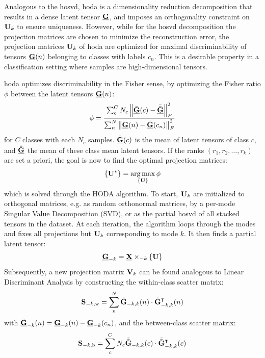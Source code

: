 Analogous to the \ac{hosvd}, \ac{hoda} is a dimensionality
reduction decomposition that results in a dense latent tensor $\ten{G}$, and
imposes an orthogonality constraint on $\mat{U}_k$ to ensure uniqueness.
However, while for the \ac{hosvd} decomposition the projection matrices
are chosen to minimize the reconstruction error, the projection matrices
$\mat{U}_k$ of \ac{hoda} are optimized for maximal discriminability of tensors
$\ten{G}(n)$ belonging to classes with labels $c_n$.
This is a desirable property in a classification setting where samples are
high-dimensional tensors.

\Ac{hoda} optimizes discriminability in the Fisher sense, by optimizing the
Fisher ratio $\phi$ between the latent tensors $\ten{G}(n)$:
\begin{equation}
	\phi = \frac{\sum_c^CN_c\left\lVert\bar{\ten{G}}(c)-\bar{\bar{\ten{G}}}\right\rVert_F^2}
	{\sum_n^N\left\lVert\ten{G}(n)-\bar{\ten{G}}(c_n)\right\rVert_F^2}
	\label{eq:fisher}
\end{equation}
for $C$ classes with each $N_c$ samples. $\bar{\ten{G}}(c)$ is the mean of
latent tensors of class $c$, and $\bar{\bar{\ten{G}}}$ the mean of
these class mean latent tensors.
If the ranks $(r_1,r_2, \ldots,r_k)$ are set a priori, the goal is now to find the optimal projection matrices:
\begin{equation}
	\left\{\mat{U}^*\right\} = \argmax_{\{\mat{U}\}}\phi
\end{equation}
which is solved through the HODA algorithm.
To start, $\mat{U}_k$ are initialized to orthogonal matrices, e.g. as random
orthonormal matrices, by a per-mode Singular Value Decomposition (SVD),
or as the partial \ac{hosvd} of all stacked tensors in the dataset.
At each iteration, the algorithm loops through the modes and fixes all
projections but $\mat{U}_k$ corresponding to mode $k$.
It then finds a partial latent tensor:
\begin{equation}
	\ten{G}_{-k}=\ten{X}\mmprs{\mat{U}}{k}
\end{equation}
Subsequently, a new projection matrix $\mat{V}_k$ can be found analogous to Linear
Discriminant Analysis by constructing the within-class scatter matrix:
\begin{equation}
	\mat{S}_{-k,\text{w}} = \sum_n^N\tilde{\mat{G}}_{-k,k}(n)\cdot\tilde{\mat{G}}_{-k,k}^\intercal(n)
\end{equation}
with $\tilde{\ten{G}}_{-k}(n) = \ten{G}_{-k}(n) - \bar{\ten{G}}_{-k}(c_n)$,
and the between-class scatter matrix:
\begin{equation}
	\mat{S}_{-k,\text{b}} =
	\sum_c^CN_c\tilde{\bar{\mat{G}}}_{-k,k}(c)\cdot\tilde{\bar{\mat{G}}}_{-k,k}^\intercal(c)
\end{equation}
